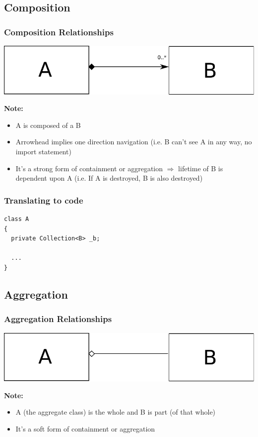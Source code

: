 \documentclass{beamer}
\begin{document}
\subsection{Composition}
\begin{frame}
	\frametitle{Composition Relationships}
	\begin{center}
		\includegraphics[scale=0.4]{composition}
	\end{center}
	\textbf{Note:}
	\begin{itemize}
  			\item A is composed of a B
  			\item Arrowhead implies one direction navigation (i.e. B can't see A in any way, no import statement)
  			\item It's a strong form of containment or aggregation $\Rightarrow$ lifetime of B is dependent upon A (i.e. If A is destroyed, B is also destroyed)
	\end{itemize}
\end{frame}

\begin{frame}[containsverbatim]
	\frametitle{Translating to code}
	\begin{lstlisting}
class A  
{   
  private Collection<B> _b;

  ...
}
\end{lstlisting}
\end{frame}

\subsection{Aggregation}
\begin{frame}
	\frametitle{Aggregation Relationships}
	\begin{center}
		\includegraphics[scale=0.4]{aggregation}
	\end{center}
	\textbf{Note:}
	\begin{itemize}
  			\item A (the aggregate class) is the whole and B is part (of that whole)
  			\item It's a soft form of containment or aggregation
	\end{itemize}
\end{frame}
\end{document}
